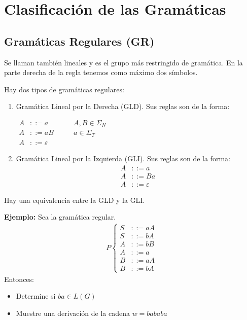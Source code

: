 \section{Clasificación de las Gramáticas}

\subsection{Gramáticas Regulares (GR)}
Se llaman también lineales y es el grupo más restringido de gramática. En la parte derecha de la regla tenemos como máximo dos símbolos.

Hay dos tipos de gramáticas regulares:
\begin{enumerate}
\item Gramática Lineal por la Derecha (GLD). Sus reglas son de la forma:

$\begin{array}{clc}
A&::=a	&\qquad A,B\in \Sigma_N \\
A&::=aB	&\qquad a\in\Sigma_T	\\
A&::=\varepsilon	&
\end{array}$
	
\item Gramática Lineal por la Izquierda (GLI). Sus reglas son de la forma:
\begin{align*}
A&::=a	\\
A&::=Ba	\\
A&::=\varepsilon
\end{align*}
\end{enumerate}
Hay una equivalencia entre la GLD y la GLI.

\textbf{Ejemplo: }Sea la gramática regular.
\begin{align*}
P\left\{\begin{array}{rl}
S&::=aA	\\	
S&::=bA	\\
A&::=bB	\\
A&::=a	\\
B&::=aA	\\
B&::=bA		
\end{array}\right.
\end{align*}
Entonces:
\begin{itemize}
\item Determine si $ba\in L(G)$
\item Muestre una derivación de la cadena $w=bababa$
\end{itemize}